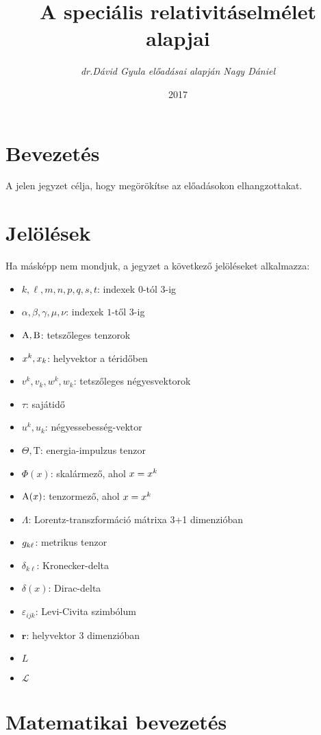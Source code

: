 \documentclass[a4paper,12pt]{article}
\title{\textbf{A speciális relativitáselmélet alapjai\\
\vspace{24pt}}}
\author{\textsl{dr.Dávid Gyula előadásai alapján Nagy Dániel}}
\date{2017}
\begin{document}
\maketitle
\pagebreak
\tableofcontents

\section{Bevezetés}
A jelen jegyzet célja, hogy megörökítse az előadásokon elhangzottakat.
\section{Jelölések}
Ha másképp nem mondjuk, a jegyzet a következő jelöléseket alkalmazza: \\
\begin{itemize}
\item $k, \ell, m, n, p, q, s, t$: indexek $0$-tól $3$-ig
\item $\alpha, \beta, \gamma, \mu, \nu$: indexek $1$-től $3$-ig
\item $\mathrm{A},\mathrm{B}$: tetszőleges tenzorok
\item $x^k, x_k$: helyvektor a téridőben
\item $v^k, v_k, w^k, w_k$: tetszőleges négyesvektorok
\item $\tau$: sajátidő
\item $u^k, u_k$: négyessebesség-vektor
\item $\Theta, \mathrm{T}$: energia-impulzus tenzor
\item $\Phi(x)$: skalármező, ahol $x=x^k$
\item $\mathrm{A}(x)$: tenzormező, ahol $x=x^k$
\item $\Lambda$: Lorentz-transzformáció mátrixa 3+1 dimenzióban
\item $g_{k\ell}$: metrikus tenzor
\item $\delta_{k\ell}$: Kronecker-delta
\item $\delta(x)$: Dirac-delta
\item $\varepsilon_{ijk}$: Levi-Civita szimbólum
\item $\mathbf{r}$: helyvektor 3 dimenzióban
\item $L$
\item $\mathcal{L}$
\end{itemize}

\pagebreak
\section{Matematikai bevezetés}
\end{document}
